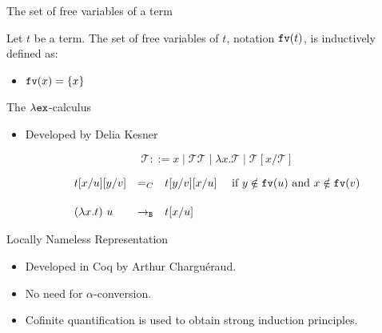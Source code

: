 \documentclass[10pt]{beamer}
\newcommand{\term}{{\mathcal{T}}}
\newcommand{\fv}[1]{{\tt fv}(#1)}
\newcommand{\set}[1]{\{#1\}}
\begin{document}
\begin{frame}[fragile]{The set of free variables of a term}
\begin{definition}
  Let $t$ be a term. The set of free variables of $t$, notation $\fv{t}$, is inductively defined as:
  \begin{itemize}
  \item $\fv{x} = \set{x}$
  \end{itemize}
\end{definition}
\end{frame}

\begin{frame}[fragile]{The $\lambda{\tt ex}$-calculus}
\begin{itemize}
\item Developed by Delia Kesner \cite{kes09}

  $$\term ::= x \mid \term\term \mid \lambda x.\term \mid \term[x/\term]$$

  $$\begin{array}{llll}
      t[x/u][y/v] & =_C & t[y/v][x/u] & \mbox{ if } y \notin\fv{u} \mbox{ and } x \notin \fv{v} \\[.5cm]
      (\lambda x. t)\ u & \to_{\tt B} & t[x/u] & \\      
      \end{array}$$
  
\end{itemize}
\end{frame}

\begin{frame}[fragile]{Locally Nameless Representation}
\begin{itemize}
\item Developed in Coq by Arthur Charguéraud.
\item No need for $\alpha$-conversion.
\item Cofinite quantification is used to obtain strong induction principles.
\end{itemize}
\end{frame}



\end{document}
